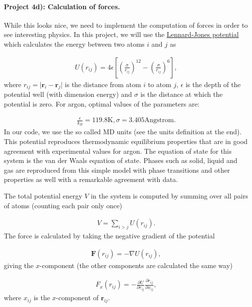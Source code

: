 \documentclass[%
oneside,                 %
final,                   %
10pt]{article}
\begin{document}
\paragraph{Project 4d): Calculation of forces.}
While this looks nice, we need to implement the computation of forces in order to see interesting physics. In this project, we will use the \href{{http://en.wikipedia.org/wiki/Lennard-Jones_potential}}{Lennard-Jones potential}  which calculates the energy between two atoms $i$ and $j$ as

\begin{align}
	U(r_{ij}) = 4\epsilon\left[\left(\frac{\sigma}{r_{ij}}\right)^{12} - \left(\frac{\sigma}{r_{ij}}\right)^6\right],
\end{align}
where $r_{ij} = \vert\mathbf{r}_i - \mathbf{r}_j\vert$ is the distance from atom $i$ to atom $j$, $\epsilon$ is the depth of the potential well (with dimension energy) and $\sigma$ is the distance at which the potential is zero. For argon, optimal values of the parameters are:

\begin{align}
	\frac{\epsilon}{k_B} = 119.8\mathrm{K}, \sigma=3.405 \mathrm{Angstrom}.
\end{align}
In our code, we use the so called MD units (see the units definition at the end). This potential reproduces thermodynamic equilibrium properties that are in good agreement with experimental values for argon. The equation of state for this system is the van der Waals equation of state. Phases such as solid, liquid and gas are reproduced from this simple model with phase transitions and other properties as well with a  remarkable agreement with data.

The total potential energy $V$ in the system is computed by summing over all pairs of atoms (counting each pair only once)

\begin{align}
	V = \sum_{i>j} U(r_{ij}).
\end{align}
The force is calculated by taking the negative gradient of the potential

\begin{align}
	\mathbf{F}(r_{ij}) = -\nabla U(r_{ij}),
\end{align}
giving the $x$-component (the other components are calculated the same way)

\begin{align}
	F_x(r_{ij}) = -\frac{\partial U}{\partial r_{ij}}\frac{\partial r_{ij}}{\partial x_{ij}},
\end{align}
where $x_{ij}$ is the $x$-component of $\mathbf{r}_{ij}$.
\end{document}

